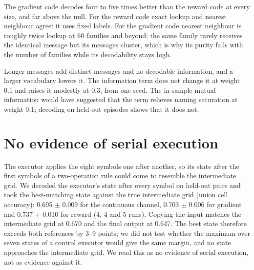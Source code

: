 \documentclass[11pt]{article}
\begin{document}
\begin{table}[h]\centering\small
\caption{Decoding of the rule family from the message on held-out episodes, ten episodes per family; the
null is the 95th percentile over 200 permutations of the family labels in each fitted half, scored with the same
two-fold average as the data, the larger of
the two channels.}\label{tab:decoding}
\end{table}

The gradient code decodes four to five times better than the reward code at every size, and far above the
null. For the reward code exact lookup and nearest neighbour agree: it uses fixed labels. For the gradient
code nearest neighbour is roughly twice lookup at 60 families and beyond: the same family rarely receives the
identical message but its messages cluster, which is why its purity falls with the number of families while
its decodability stays high.

\begin{table}[h]\centering\small
\caption{What changes the decodability of a reward-trained code at 239 families.}\label{tab:decomposition}
\end{table}

Longer messages add distinct messages and no decodable information, and a larger vocabulary lowers it.
The information term does not change it at weight 0.1 and raises it modestly at 0.3, from one seed. The
in-sample mutual information would have suggested that the term relieves naming saturation at weight 0.1;
decoding on held-out episodes shows that it does not.

\section{No evidence of serial execution}
The executor applies the eight symbols one after another, so its state after the first symbols of a
two-operation rule could come to resemble the intermediate grid. We decoded the executor's state after every
symbol on held-out pairs and took the best-matching state against the true intermediate grid (union cell
accuracy): 0.695 $\pm$ 0.009 for the continuous channel, 0.703 $\pm$ 0.006 for gradient and 0.737 $\pm$ 0.010
for reward (4, 4 and 5 runs). Copying the input matches the intermediate grid at 0.670 and the final output at
0.647. The best state therefore exceeds both references by 3--9 points; we did not test whether the maximum over
seven states of a control executor would give the same margin, and no state approaches the intermediate grid. We read this as no
evidence of serial execution, not as evidence against it.
\end{document}
